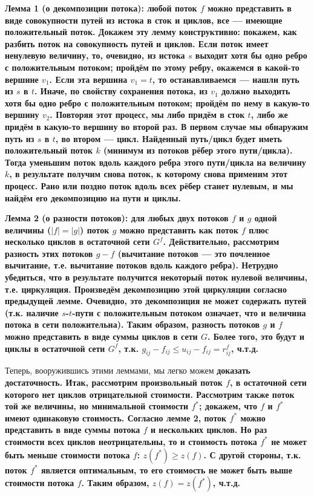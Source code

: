\bf{Лемма 1} (о декомпозиции потока): любой поток $f$ можно представить в виде совокупности путей из истока в сток и циклов, все --- имеющие положительный поток. Докажем эту лемму конструктивно: покажем, как разбить поток на совокупность путей и циклов. Если поток имеет ненулевую величину, то, очевидно, из истока $s$ выходит хотя бы одно ребро с положительным потоком; пройдём по этому ребру, окажемся в какой-то вершине $v_1$. Если эта вершина $v_1 = t$, то останавливаемся --- нашли путь из $s$ в $t$. Иначе, по свойству сохранения потока, из $v_1$ должно выходить хотя бы одно ребро с положительным потоком; пройдём по нему в какую-то вершину $v_2$. Повторяя этот процесс, мы либо придём в сток $t$, либо же придём в какую-то вершину во второй раз. В первом случае мы обнаружим путь из $s$ в $t$, во втором --- цикл. Найденный путь/цикл будет иметь положительный поток $k$ (минимум из потоков рёбер этого пути/цикла). Тогда уменьшим поток вдоль каждого ребра этого пути/цикла на величину $k$, в результате получим снова поток, к которому снова применим этот процесс. Рано или поздно поток вдоль всех рёбер станет нулевым, и мы найдём его декомпозицию на пути и циклы.

\bf{Лемма 2} (о разности потоков): для любых двух потоков $f$ и $g$ одной величины ($|f| = |g|$) поток $g$ можно представить как поток $f$ плюс несколько циклов в остаточной сети $G^f$. Действительно, рассмотрим разность этих потоков $g-f$ (вычитание потоков --- это почленное вычитание, т.е. вычитание потоков вдоль каждого ребра). Нетрудно убедиться, что в результате получится некоторый поток нулевой величины, т.е. циркуляция. Произведём декомпозицию этой циркуляции согласно предыдущей лемме. Очевидно, это декомпозиция не может содержать путей (т.к. наличие $s$-$t$-пути с положительным потоком означает, что и величина потока в сети положительна). Таким образом, разность потоков $g$ и $f$ можно представить в виде суммы циклов в сети $G$. Более того, это будут и циклы в остаточной сети $G^f$, т.к. $g_{ij} - f_{ij} \le u_{ij} - f_{ij} = r_{ij}^f$, ч.т.д.

Теперь, вооружившись этими леммами, мы легко можем \bf{доказать достаточность}. Итак, рассмотрим произвольный поток $f$, в остаточной сети которого нет циклов отрицательной стоимости. Рассмотрим также поток той же величины, но минимальной стоимости $f^*$; докажем, что $f$ и $f^*$ имеют одинаковую стоимость. Согласно лемме 2, поток $f^*$ можно представить в виде суммы потока $f$ и нескольких циклов. Но раз стоимости всех циклов неотрицательны, то и стоимость потока $f^*$ не может быть меньше стоимости потока $f$: $z(f^*) \ge z(f)$. С другой стороны, т.к. поток $f^*$ является оптимальным, то его стоимость не может быть выше стоимости потока $f$. Таким образом, $z(f) = z(f^*)$, ч.т.д.

